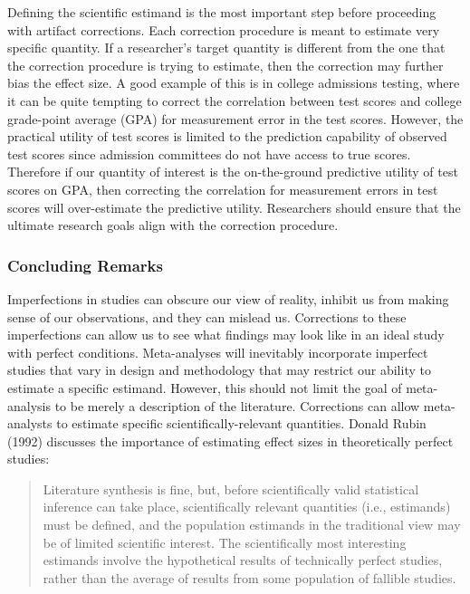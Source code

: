 \documentclass[
  letterpaper,
  DIV=11,
  numbers=noendperiod]{scrreprt}
\begin{document}
Defining the scientific estimand is the most important step before
proceeding with artifact corrections. Each correction procedure is meant
to estimate very specific quantity. If a researcher's target quantity is
different from the one that the correction procedure is trying to
estimate, then the correction may further bias the effect size. A good
example of this is in college admissions testing, where it can be quite
tempting to correct the correlation between test scores and college
grade-point average (GPA) for measurement error in the test scores.
However, the practical utility of test scores is limited to the
prediction capability of observed test scores since admission committees
do not have access to true scores. Therefore if our quantity of interest
is the on-the-ground predictive utility of test scores on GPA, then
correcting the correlation for measurement errors in test scores will
over-estimate the predictive utility. Researchers should ensure that the
ultimate research goals align with the correction procedure.

\subsubsection*{Concluding Remarks}\label{concluding-remarks}

Imperfections in studies can obscure our view of reality, inhibit us
from making sense of our observations, and they can mislead us.
Corrections to these imperfections can allow us to see what findings may
look like in an ideal study with perfect conditions. Meta-analyses will
inevitably incorporate imperfect studies that vary in design and
methodology that may restrict our ability to estimate a specific
estimand. However, this should not limit the goal of meta-analysis to be
merely a description of the literature. Corrections can allow
meta-analysts to estimate specific scientifically-relevant quantities.
Donald Rubin (1992) discusses the importance of estimating effect sizes
in theoretically perfect studies:

\begin{quote}
Literature synthesis is fine, but, before scientifically valid
statistical inference can take place, scientifically relevant quantities
(i.e., estimands) must be defined, and the population estimands in the
traditional view may be of limited scientific interest. The
scientifically most interesting estimands involve the hypothetical
results of technically perfect studies, rather than the average of
results from some population of fallible studies.
\end{quote}
\end{document}
